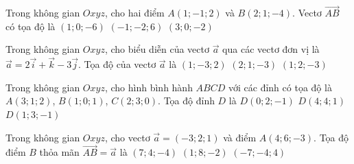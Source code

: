 \begin{ex}%
Trong không gian $Oxyz$, cho hai điểm $A(1; -1; 2)$ và $B(2; 1; -4)$. Vectơ $\overrightarrow{AB}$ có tọa độ là
 {$(1; 0; -6)$}
 {$(-1; -2; 6)$}
 {$(3; 0; -2)$}
\end{ex}

\begin{ex}%
Trong không gian $Oxyz$, cho biểu diễn của vectơ $\overrightarrow{a}$ qua các vectơ đơn vị là $\overrightarrow{a}=2\overrightarrow{i}+\overrightarrow{k}-3\overrightarrow{j}$. Tọa độ của vectơ $\overrightarrow{a}$ là
 {$(1; -3; 2)$}
 {$(2; 1; -3)$}
 {$(1; 2; -3)$}
\end{ex}

\begin{ex}%
Trong không gian $Oxyz$, cho hình bình hành $ABCD$ với các đỉnh có tọa độ là $A(3; 1; 2)$, $B(1; 0; 1)$, $C(2; 3; 0)$. Tọa độ đỉnh $D$ là
 {$D(0; 2; -1)$}
 {\True $D(4; 4; 1)$}
 {$D(1; 3; -1)$}
\end{ex}

\begin{ex}%
Trong không gian $Oxyz$, cho vectơ $\overrightarrow{a}=(-3; 2; 1)$ và điểm $A(4; 6; -3)$. Tọa độ điểm $B$ thỏa mãn $\overrightarrow{AB}=\overrightarrow{a}$ là
 {$(7; 4; -4)$}
 {\True $(1; 8; -2)$}
 {$(-7; -4; 4)$}
\end{ex}

